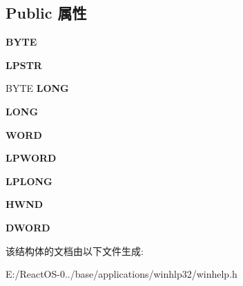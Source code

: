 \subsection*{Public 属性}
\begin{DoxyCompactItemize}
\item 
\mbox{\label{structwinhelp__callbacks_ada06114700adeca0b4df8602f6b27ae8}} 
{\bfseries B\+Y\+TE}
\item 
\mbox{\label{structwinhelp__callbacks_a0936b4c57cef7e575280b5b26d5247a3}} 
{\bfseries L\+P\+S\+TR}
\item 
\mbox{\label{structwinhelp__callbacks_a74e1ad8f45ce824f33a5e658f912171a}} 
B\+Y\+TE {\bfseries L\+O\+NG}
\item 
\mbox{\label{structwinhelp__callbacks_ac965b0b1fb4dacab8065aeda174570c7}} 
{\bfseries L\+O\+NG}
\item 
\mbox{\label{structwinhelp__callbacks_a648539c1da14fbd8b39e3f63865b13db}} 
{\bfseries W\+O\+RD}
\item 
\mbox{\label{structwinhelp__callbacks_a75eafaa596b42da3e88a6bc9a696372c}} 
{\bfseries L\+P\+W\+O\+RD}
\item 
\mbox{\label{structwinhelp__callbacks_a5633ba8189fd728f9e1e0e2eb9e9f7c5}} 
{\bfseries L\+P\+L\+O\+NG}
\item 
\mbox{\label{structwinhelp__callbacks_a73fdd2e20cf250cdca1780cec88032be}} 
{\bfseries H\+W\+ND}
\item 
\mbox{\label{structwinhelp__callbacks_a076ba0d8941e238ef6350397eeec144f}} 
{\bfseries D\+W\+O\+RD}
\end{DoxyCompactItemize}


该结构体的文档由以下文件生成\+:\begin{DoxyCompactItemize}
\item 
E\+:/\+React\+O\+S-\/0../base/applications/winhlp32/winhelp.\+h\end{DoxyCompactItemize}
